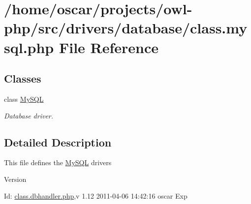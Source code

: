 \section{/home/oscar/projects/owl-\/php/src/drivers/database/class.mysql.php File Reference}
\label{class_8mysql_8php}
\subsection*{Classes}
\begin{DoxyCompactItemize}
\item 
class \hyperlink{classMySQL}{MySQL}
\begin{DoxyCompactList}\small\item\em Database driver. \item\end{DoxyCompactList}\end{DoxyCompactItemize}


\subsection{Detailed Description}
This file defines the \hyperlink{classMySQL}{MySQL} drivers \begin{DoxyVersion}{Version}

\end{DoxyVersion}
\begin{DoxyParagraph}{Id:}
\hyperlink{class_8dbhandler_8php}{class.dbhandler.php},v 1.12 2011-\/04-\/06 14:42:16 oscar Exp 
\end{DoxyParagraph}
